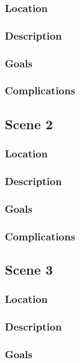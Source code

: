 \documentclass{ShadowTeXSR5}
\begin{document}
\subsubsection{Location}
\lipsum[1]
\subsubsection{Description}
\lipsum[1]
\subsubsection{Goals}
\lipsum[1]
\subsubsection{Complications}
\lipsum[1]

\subsection{Scene 2}
\lipsum[1]
\subsubsection{Location}
\lipsum[1]
\subsubsection{Description}
\lipsum[1]
\subsubsection{Goals}
\lipsum[1]
\subsubsection{Complications}
\lipsum[1]

\subsection{Scene 3}
\lipsum[1]
\subsubsection{Location}
\lipsum[1]
\subsubsection{Description}
\lipsum[1]
\subsubsection{Goals}
\lipsum[1]
\end{document}
